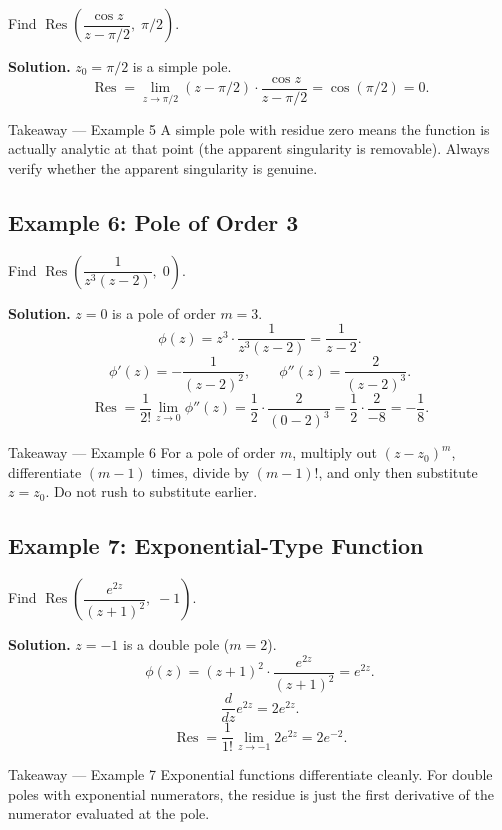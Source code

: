 \documentclass[12pt,a4paper]{article}
\begin{document}
Find $\operatorname{Res}\!\left(\dfrac{\cos z}{z - \pi/2},\; \pi/2\right)$.

\textbf{Solution.}
$z_0 = \pi/2$ is a simple pole.
\[
   \operatorname{Res} = \lim_{z\to\pi/2}(z - \pi/2)\cdot\frac{\cos z}{z - \pi/2}
   = \cos(\pi/2) = 0.
\]

\begin{learnbox}{Takeaway --- Example 5}
A simple pole with residue zero means the function is actually analytic at that point (the
apparent singularity is removable).  Always verify whether the apparent singularity is genuine.
\end{learnbox}

\subsection*{Example 6: Pole of Order 3}

Find $\operatorname{Res}\!\left(\dfrac{1}{z^3(z-2)},\; 0\right)$.

\textbf{Solution.}
$z = 0$ is a pole of order $m = 3$.
\[
   \phi(z) = z^3\cdot\frac{1}{z^3(z-2)} = \frac{1}{z-2}.
\]
\[
   \phi'(z) = -\frac{1}{(z-2)^2}, \qquad
   \phi''(z) = \frac{2}{(z-2)^3}.
\]
\[
   \operatorname{Res} = \frac{1}{2!}\lim_{z\to 0}\phi''(z)
   = \frac{1}{2}\cdot\frac{2}{(0-2)^3}
   = \frac{1}{2}\cdot\frac{2}{-8}
   = -\frac{1}{8}.
\]

\begin{learnbox}{Takeaway --- Example 6}
For a pole of order $m$, multiply out $(z-z_0)^m$, differentiate $(m-1)$ times, divide by $(m-1)!$,
and only then substitute $z = z_0$.  Do not rush to substitute earlier.
\end{learnbox}

\subsection*{Example 7: Exponential-Type Function}

Find $\operatorname{Res}\!\left(\dfrac{e^{2z}}{(z+1)^2},\; -1\right)$.

\textbf{Solution.}
$z = -1$ is a double pole ($m = 2$).
\[
   \phi(z) = (z+1)^2\cdot\frac{e^{2z}}{(z+1)^2} = e^{2z}.
\]
\[
   \frac{d}{dz}e^{2z} = 2e^{2z}.
\]
\[
   \operatorname{Res} = \frac{1}{1!}\lim_{z\to -1} 2e^{2z} = 2e^{-2}.
\]

\begin{learnbox}{Takeaway --- Example 7}
Exponential functions differentiate cleanly.  For double poles with exponential numerators,
the residue is just the first derivative of the numerator evaluated at the pole.
\end{learnbox}
\end{document}
